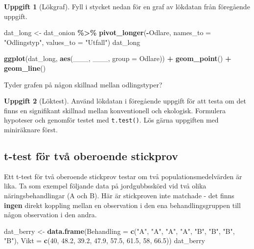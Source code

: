 \documentclass[
]{book}
\newenvironment{Shaded}{\begin{snugshade}}{\end{snugshade}}
\newcommand{\AttributeTok}[1]{\textcolor[rgb]{0.13,0.29,0.53}{#1}}
\newcommand{\DecValTok}[1]{\textcolor[rgb]{0.00,0.00,0.81}{#1}}
\newcommand{\FloatTok}[1]{\textcolor[rgb]{0.00,0.00,0.81}{#1}}
\newcommand{\FunctionTok}[1]{\textcolor[rgb]{0.13,0.29,0.53}{\textbf{#1}}}
\newcommand{\NormalTok}[1]{#1}
\newcommand{\OtherTok}[1]{\textcolor[rgb]{0.56,0.35,0.01}{#1}}
\newcommand{\SpecialCharTok}[1]{\textcolor[rgb]{0.81,0.36,0.00}{\textbf{#1}}}
\newcommand{\StringTok}[1]{\textcolor[rgb]{0.31,0.60,0.02}{#1}}
\theoremstyle{definition}
\theoremstyle{definition}
\theoremstyle{definition}
\newtheorem{exercise}{Uppgift}[chapter]
\theoremstyle{definition}
\theoremstyle{remark}
\begin{document}
\begin{exercise}[Lökgraf]
Fyll i stycket nedan för en graf av lökdatan från föregående uppgift.

\begin{Shaded}
\begin{Highlighting}[]
\NormalTok{dat\_long }\OtherTok{\textless{}{-}}\NormalTok{ dat\_onion }\SpecialCharTok{\%\textgreater{}\%} 
  \FunctionTok{pivot\_longer}\NormalTok{(}\SpecialCharTok{{-}}\NormalTok{Odlare, }\AttributeTok{names\_to =} \StringTok{"Odlingstyp"}\NormalTok{, }\AttributeTok{values\_to =} \StringTok{"Utfall"}\NormalTok{)}
\NormalTok{dat\_long}

\FunctionTok{ggplot}\NormalTok{(dat\_long, }\FunctionTok{aes}\NormalTok{(\_\_\_, \_\_\_, }\AttributeTok{group =}\NormalTok{ Odlare)) }\SpecialCharTok{+}
  \FunctionTok{geom\_point}\NormalTok{() }\SpecialCharTok{+}
  \FunctionTok{geom\_line}\NormalTok{()}
\end{Highlighting}
\end{Shaded}

Tyder grafen på någon skillnad mellan odlingstyper?
\end{exercise}

\begin{exercise}[Löktest]
Använd lökdatan i föregående uppgift för att testa om det finns en signifikant skillnad mellan konventionell och ekologisk.
Formulera hypoteser och genomför testet med \texttt{t.test()}. Lös gärna uppgiften med miniräknare först.
\end{exercise}

\subsection{t-test för två oberoende stickprov}\label{t-test-fuxf6r-tvuxe5-oberoende-stickprov}

Ett t-test för två oberoende stickprov testar om två populationsmedelvärden är lika. Ta som exempel följande data på jordgubbsskörd vid två olika näringsbehandlingar (A och B). Här är stickproven inte matchade - det finns \textbf{ingen} direkt koppling mellan en observation i den ena behandlingsgruppen till någon observation i den andra.

\begin{Shaded}
\begin{Highlighting}[]
\NormalTok{dat\_berry }\OtherTok{\textless{}{-}} \FunctionTok{data.frame}\NormalTok{(}\AttributeTok{Behandling =} \FunctionTok{c}\NormalTok{(}\StringTok{"A"}\NormalTok{, }\StringTok{"A"}\NormalTok{, }\StringTok{"A"}\NormalTok{, }\StringTok{"A"}\NormalTok{, }\StringTok{"B"}\NormalTok{, }\StringTok{"B"}\NormalTok{, }\StringTok{"B"}\NormalTok{, }\StringTok{"B"}\NormalTok{),}
              \AttributeTok{Vikt =} \FunctionTok{c}\NormalTok{(}\DecValTok{40}\NormalTok{, }\FloatTok{48.2}\NormalTok{, }\FloatTok{39.2}\NormalTok{, }\FloatTok{47.9}\NormalTok{, }\FloatTok{57.5}\NormalTok{, }\FloatTok{61.5}\NormalTok{, }\DecValTok{58}\NormalTok{, }\FloatTok{66.5}\NormalTok{))}
\NormalTok{dat\_berry}
\end{Highlighting}
\end{Shaded}
\end{document}

